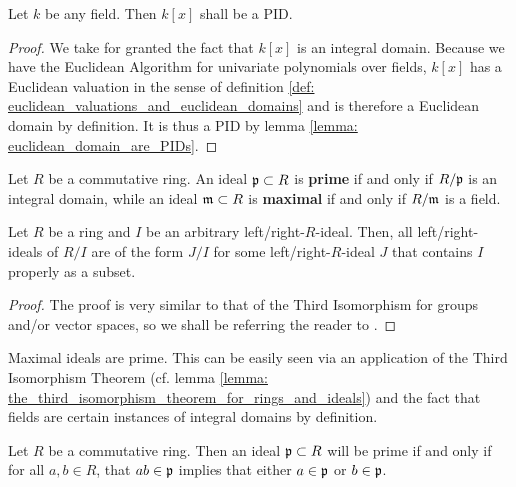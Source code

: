         \begin{proposition} \label{prop: polynomial_rings_over_fields_are_PIDs}
            Let $k$ be any field. Then $k[x]$ shall be a PID.
        \end{proposition}
            \begin{proof}
                We take for granted the fact that $k[x]$ is an integral domain. Because we have the Euclidean Algorithm for univariate polynomials over fields, $k[x]$ has a Euclidean valuation in the sense of definition \ref{def: euclidean_valuations_and_euclidean_domains} and is therefore a Euclidean domain by definition. It is thus a PID by lemma \ref{lemma: euclidean_domain_are_PIDs}. 
            \end{proof}
            
        \begin{definition} \label{def: prime_and_maximal_ideals}
            Let $R$ be a commutative ring. An ideal $\mathfrak{p} \subset R$ is \textbf{prime} if and only if $R/\mathfrak{p}$ is an integral domain, while an ideal $\mathfrak{m} \subset R$ is \textbf{maximal} if and only if $R/\mathfrak{m}$ is a field. 
        \end{definition}
        \begin{lemma} \label{lemma: the_third_isomorphism_theorem_for_rings_and_ideals}
            \cite[Proposition III.3.11]{aluffi_chapter_0} Let $R$ be a ring and $I$ be an arbitrary left/right-$R$-ideal. Then, all left/right-ideals of $R/I$ are of the form $J/I$ for some left/right-$R$-ideal $J$ that contains $I$ properly as a subset. 
        \end{lemma}
            \begin{proof}
                The proof is very similar to that of the Third Isomorphism for groups and/or vector spaces, so we shall be referring the reader to \cite[Proposition III.3.11]{aluffi_chapter_0}.
            \end{proof}
        \begin{remark} \label{remark: maximal_ideals_are_prime}
            Maximal ideals are prime. This can be easily seen via an application of the Third Isomorphism Theorem (cf. lemma \ref{lemma: the_third_isomorphism_theorem_for_rings_and_ideals}) and the fact that fields are certain instances of integral domains by definition. 
        \end{remark}
        \begin{lemma} \label{lemma: factorisation_and_prime_ideals}
            Let $R$ be a commutative ring. Then an ideal $\mathfrak{p} \subset R$ will be prime if and only if for all $a, b \in R$, that $ab \in \mathfrak{p}$ implies that either $a \in \mathfrak{p}$ or $b \in \mathfrak{p}$. 
        \end{lemma}
